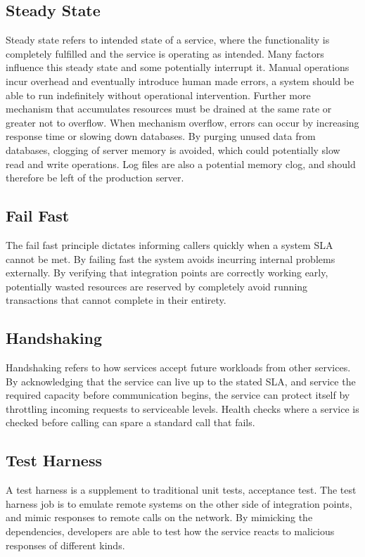 \subsection{Steady State}
Steady state refers to intended state of a service, where the functionality is completely fulfilled and the service is operating as intended. Many factors influence this steady state and some potentially interrupt it. Manual operations incur overhead and eventually introduce human made errors, a system should be able to run indefinitely without operational intervention. 
Further more mechanism that accumulates resources must be drained at the same rate or greater not to overflow. When mechanism overflow, errors can occur by increasing response time or slowing down databases. By purging unused data from databases, clogging of server memory is avoided, which could potentially slow read and write operations. Log files are also a potential memory clog, and should therefore be left of the production server.

\subsection{Fail Fast}
The fail fast principle dictates informing callers quickly when a system SLA cannot be met. By failing fast the system avoids incurring internal problems externally. By verifying that integration points are correctly working early, potentially wasted resources are reserved by completely avoid running transactions that cannot complete in their entirety.

\subsection{Handshaking}
Handshaking refers to how services accept future workloads from other services. By acknowledging that the service can live up to the stated SLA, and service the required capacity before communication begins, the service can protect itself by throttling incoming requests to serviceable levels. Health checks where a service is checked before calling can spare a standard call that fails.

\subsection{Test Harness}
A test harness is a supplement to traditional unit tests, acceptance test. The test harness job is to emulate remote systems on the other side of integration points, and mimic responses to remote calls on the network. By mimicking the dependencies, developers are able to test how the service reacts to malicious responses of different kinds.

